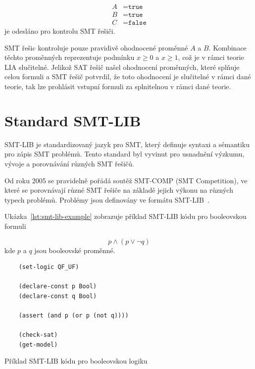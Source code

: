\begin{align*}
    A &= \texttt{true} \\
    B &= \texttt{true} \\
    C &= \texttt{false}
\end{align*}
je odesláno pro kontrolu SMT řešiči.

SMT řešic kontroluje pouze pravidivě ohodnocené proměnné $A$ a $B$.
Kombinace těchto proměnných reprezentuje podmínku $x \geq 0$ a $x \geq 1$,
což je v rámci teorie LIA slučitelné.
Jelikož SAT řešič našel ohodnocení proměnných, které splňuje celou formuli
a SMT řešič potvrdil, že toto ohodnocení je slučitelné v rámci dané teorie,
tak lze prohlásit vstupní formuli za splnitelnou v rámci dané teorie.

\section{Standard SMT-LIB}
\label{sec:smt-lib}

SMT-LIB je standardizovaný jazyk pro SMT, který definuje syntaxi a sémantiku pro zápis SMT problémů.
Tento standard byl vyvinut pro usnadnění výzkumu, vývoje a porovnávání různých SMT řešičů.

Od roku 2005 se pravidelně pořádá soutěž SMT-COMP (SMT Competition),
ve které se porovnávají různé SMT řešiče na základě jejich výkonu na různých typech problémů.
Problémy jsou definovány ve formátu SMT-LIB~\cite{SMTCOMP}.

Ukázka~\ref{lst:smt-lib-example} zobrazuje příklad SMT-LIB kódu pro booleovskou formuli

\begin{equation*}
    p \land (p \lor \neg q)
\end{equation*}
kde $p$ a $q$ jsou booleovské proměnné.

\begin{listing}[H]
    \begin{verbatim}
    (set-logic QF_UF)

    (declare-const p Bool)
    (declare-const q Bool)

    (assert (and p (or p (not q))))

    (check-sat)
    (get-model)
    \end{verbatim}
    \caption{Příklad SMT-LIB kódu pro booleovskou logiku}
    \label{lst:smt-lib-example}
\end{listing}

